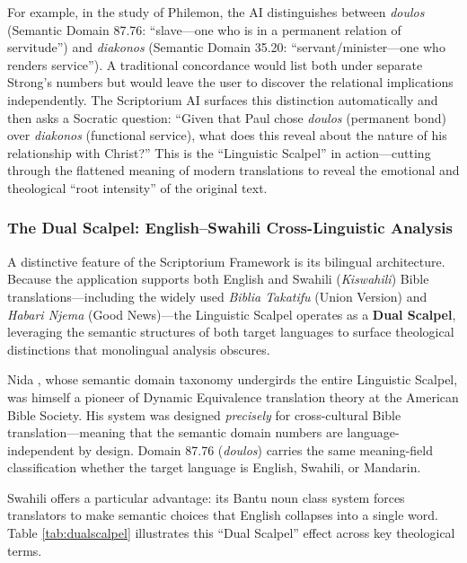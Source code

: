 For example, in the study of Philemon, the AI distinguishes between \textit{doulos} (Semantic Domain 87.76: ``slave---one who is in a permanent relation of servitude'') and \textit{diakonos} (Semantic Domain 35.20: ``servant/minister---one who renders service''). A traditional concordance would list both under separate Strong's numbers but would leave the user to discover the relational implications independently. The Scriptorium AI surfaces this distinction automatically and then asks a Socratic question: ``Given that Paul chose \textit{doulos} (permanent bond) over \textit{diakonos} (functional service), what does this reveal about the nature of his relationship with Christ?'' This is the ``Linguistic Scalpel'' in action---cutting through the flattened meaning of modern translations to reveal the emotional and theological ``root intensity'' of the original text.

\subsubsection{The Dual Scalpel: English--Swahili Cross-Linguistic Analysis}
A distinctive feature of the Scriptorium Framework is its bilingual architecture. Because the application supports both English and Swahili (\textit{Kiswahili}) Bible translations---including the widely used \textit{Biblia Takatifu} (Union Version) and \textit{Habari Njema} (Good News)---the Linguistic Scalpel operates as a \textbf{Dual Scalpel}, leveraging the semantic structures of both target languages to surface theological distinctions that monolingual analysis obscures.

Nida \cite{louwnida1988}, whose semantic domain taxonomy undergirds the entire Linguistic Scalpel, was himself a pioneer of Dynamic Equivalence translation theory at the American Bible Society. His system was designed \textit{precisely} for cross-cultural Bible translation---meaning that the semantic domain numbers are language-independent by design. Domain 87.76 (\textit{doulos}) carries the same meaning-field classification whether the target language is English, Swahili, or Mandarin.

Swahili offers a particular advantage: its Bantu noun class system forces translators to make semantic choices that English collapses into a single word. Table \ref{tab:dualscalpel} illustrates this ``Dual Scalpel'' effect across key theological terms.

